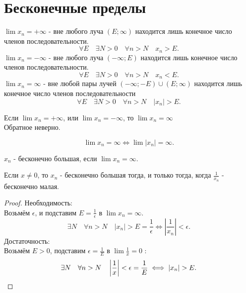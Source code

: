\documentclass[11pt, oneside]{article}   	%
\begin{document}
\section{Бесконечные пределы}
    \begin{definition}
        $\lim x_n =+\infty$ - вне любого луча $(E; \infty)$ находится лишь конечное число членов последовательности.
        \[ \forall{E}\quad \exists{N>0}\quad \forall{n>N}\quad x_n > E .\] 
        $\lim x_n=-\infty$ - вне любого луча $(-\infty; E)$ находится лишь конечное число членов последовательности.
        \[ \forall{E}\quad \exists{N>0}\quad \forall{n>N}\quad x_n<E .\] 
        $\lim x_n = \infty$ - вне любой пары лучей $(-\infty; -E)\cup (E; \infty)$ находится лишь конечное число членов последовательности
        \[ \forall{E}\quad \exists{N>0}\quad \forall{n>N}\quad |x_n|>E .\] 
    \end{definition}
    \begin{dlemma}
        Если $\lim x_n = +\infty$, или $\lim x_n = -\infty$, то $\lim x_n = \infty$\\
        Обратное неверно.
    \end{dlemma}
    \begin{dlemma}
        \[ \lim x_n = \infty \iff \lim |x_n| = \infty  .\] 
    \end{dlemma}
    \begin{definition}
        $x_n$ - бесконечно большая, если  $\lim x_n = \infty$.
    \end{definition}
    \begin{theorem}
        Если  $x \neq 0$, то $x_n$ - бесконечно большая тогда, и только тогда, когда  $\frac{1}{x_n}$ - бесконечно малая.
        \begin{proof}
            Необходимость:\\
            Возьмём $\epsilon$, и подставим  $E = \frac{1}{\epsilon}$ в $\lim x_n = \infty$.\\
            \[\exists{N}\quad \forall{n>N}\quad |x_n|>E=\frac{1}{\epsilon} \iff |\frac{1}{x_n}| < \epsilon .\]
            Достаточность:\\
            Возьмём $E>0$, подставим  $\epsilon=\frac{1}{E}$ в $\lim \frac{1}{x} = 0$ :
            \[ \exists{N}\quad \forall{n>N}\quad \left|\frac{1}{x}\right|<\epsilon=\frac{1}{E} \iff  |x_n|>E .\qedhere\] 
        \end{proof}
    \end{theorem}
\end{document}
